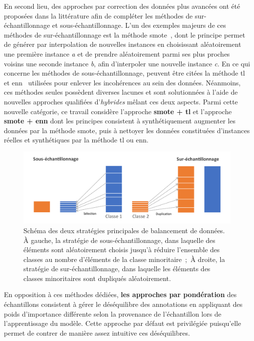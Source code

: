 En second lieu, des approches par correction des données plus avancées ont été proposées dans la littérature afin de compléter les méthodes de sur-échantillonnage et sous-échantillonnage. L'un des exemples majeurs de ces méthodes de sur-échantillonnage est la méthode \gls{smote}~\cite{Chawla2002}, dont le principe permet de générer par interpolation de nouvelles instances en choisissant aléatoirement une première instance \textit{a} et de prendre aléatoirement parmi ses plus proches voisins une seconde instance \textit{b}, afin d'interpoler une nouvelle instance \textit{c}. En ce qui concerne les méthodes de sous-échantillonnage, peuvent être citées la méthode \gls{tl}~\cite{Tomek1976} et \gls{enn}~\cite{Wilson1972} utilisées pour enlever les incohérences au sein des données. Néanmoins, ces méthodes seules possèdent diverses lacunes et sont solutionnées à l'aide de nouvelles approches qualifiées d'\textit{hybrides} mêlant ces deux aspects. Parmi cette nouvelle catégorie, ce travail considère l'approche \textbf{\gls{smote} + \gls{tl}} et l'approche \textbf{\gls{smote} + \gls{enn}} dont les principes consistent à synthétiquement augmenter les données par la méthode \gls{smote}, puis à nettoyer les données constituées d'instances réelles et synthétiques par la méthode \gls{tl} ou \gls{enn}.

\begin{figure}[H]
    \centering
    \includegraphics[width=\linewidth]{contents/chapter_5/resources/scheme_data_balancing.pdf}
    \caption{Schéma des deux stratégies principales de balancement de données. À gauche, la stratégie de sous-échantillonnage, dans laquelle des éléments sont aléatoirement choisis jusqu'à réduire l'ensemble des classes au nombre d'éléments de la classe minoritaire~;~À droite, la stratégie de sur-échantillonnage, dans laquelle les éléments des classes minoritaires sont dupliqués aléatoirement.}
    \label{fig:scheme_data_balancing}
\end{figure}\par

En opposition à ces méthodes dédiées, \textbf{les approches par pondération} des échantillons consistent à gérer le déséquilibre des annotations en appliquant des poids d'importance différente selon la provenance de l'échantillon lors de l'apprentissage du modèle. Cette approche par défaut est privilégiée puisqu'elle permet de contrer de manière assez intuitive ces déséquilibres.\par

